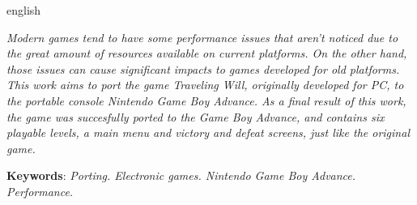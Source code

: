 \begin{resumo}[Abstract]
  \begin{otherlanguage*}{english}

    \textit{Modern games tend to have some performance issues that aren’t noticed due to the great amount of resources available on current platforms. On the other hand, those issues can cause significant impacts to games developed for old platforms. This work aims to port the game Traveling Will, originally developed for PC, to the portable console Nintendo Game Boy Advance. As a final result of this work, the game was succesfully ported to the Game Boy Advance, and contains six playable levels, a main menu and victory and defeat screens, just like the original game.}

    \vspace{\onelineskip}

    \noindent
    \textbf{Keywords}: \textit{Porting. Electronic games. Nintendo Game Boy Advance. Performance.}
  \end{otherlanguage*}
\end{resumo}

